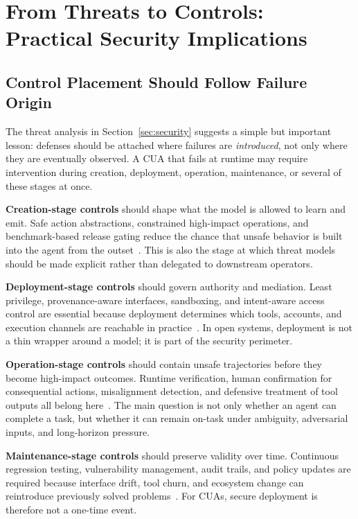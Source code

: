 \section{From Threats to Controls: Practical Security Implications}
\label{sec:discussion}

\subsection{Control Placement Should Follow Failure Origin}
\label{subsec:implications}

The threat analysis in Section~\ref{sec:security} suggests a simple but important lesson: defenses should be attached where failures are \emph{introduced}, not only where they are eventually observed. A CUA that fails at runtime may require intervention during creation, deployment, operation, maintenance, or several of these stages at once.

\textbf{Creation-stage controls} should shape what the model is allowed to learn and emit. Safe action abstractions, constrained high-impact operations, and benchmark-based release gating reduce the chance that unsafe behavior is built into the agent from the outset~\cite{kuntz2025harm,tian2025measuring,miculicich2025veriguard}. This is also the stage at which threat models should be made explicit rather than delegated to downstream operators.

\textbf{Deployment-stage controls} should govern authority and mediation. Least privilege, provenance-aware interfaces, sandboxing, and intent-aware access control are essential because deployment determines which tools, accounts, and execution channels are reachable in practice~\cite{gong2025secure,meng2025cellmate,foerster2026camels}. In open systems, deployment is not a thin wrapper around a model; it is part of the security perimeter.

\textbf{Operation-stage controls} should contain unsafe trajectories before they become high-impact outcomes. Runtime verification, human confirmation for consequential actions, misalignment detection, and defensive treatment of tool outputs all belong here~\cite{kang2025mitigating,ning2026actions,zhang2025browsesafe}. The main question is not only whether an agent can complete a task, but whether it can remain on-task under ambiguity, adversarial inputs, and long-horizon pressure.

\textbf{Maintenance-stage controls} should preserve validity over time. Continuous regression testing, vulnerability management, audit trails, and policy updates are required because interface drift, tool churn, and ecosystem change can reintroduce previously solved problems~\cite{zheng2026riskybench,wang2026asset,liu2026clawkeeper}. For CUAs, secure deployment is therefore not a one-time event.


